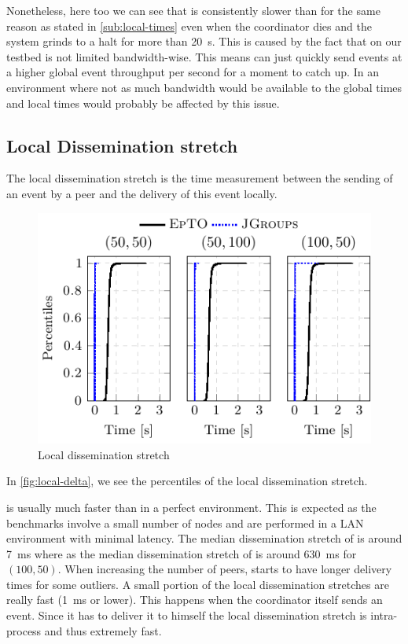 Nonetheless, here too we can see that \epto is consistently slower than \jgroups for the same reason as stated in \autoref{sub:local-times} even when the coordinator dies and the system grinds to a halt for more than \SI{20}{\second}. This is caused by the fact that on our testbed \jgroups is not limited bandwidth-wise. This means \jgroups can just quickly send events at a higher global event throughput per second for a moment to catch up. In an environment where not as much bandwidth would be available to \jgroups the global times and local times would probably be affected by this issue.
\subsection{Local Dissemination stretch}
The local dissemination stretch is the time measurement between the sending of an event by a peer and the delivery of this event locally.
 \begin{figure}[hpt]
 	\centering
 	\includegraphics[width=\linewidth]{figures/local-diss-stretch-nochurn.pdf}
 	\vspace{-2mm} 
 	\caption{Local dissemination stretch}
 	\vspace{-2mm}
 	\label{fig:local-delta}  
 \end{figure}
In \autoref{fig:local-delta}, we see the percentiles of the local dissemination stretch.
\par
\jgroups is usually much faster than \epto in a perfect environment. This is expected as the benchmarks involve a small number of nodes and are performed in a LAN environment with minimal latency. The median dissemination stretch of \jgroups is around \SI{7}{\milli\second} where as the median dissemination stretch of \epto is around \SI{630}{\milli\second} for $(100,50)$. When increasing the number of peers, \jgroups starts to have longer delivery times for some outliers. A small portion of the local dissemination stretches are really fast (\SI{1}{\milli\second} or lower). This happens when the coordinator itself sends an event. Since it has to deliver it to himself the local dissemination stretch is intra-process and thus extremely fast.

